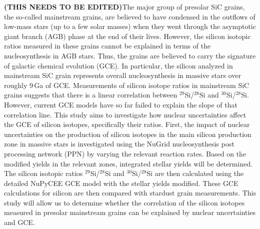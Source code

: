 \documentclass{brandeis-thesis3.2}
\newcommand{\iso}[2]{$^{#1}${#2}}
\begin{document}
\clearpage

\begin{thesis-abstract}
\textbf{(THIS NEEDS TO BE EDITED)}The major group of presolar SiC grains, the so-called mainstream grains, are believed to have condensed in the outflows of low-mass stars (up to a few solar masses) when they went through the asymptotic giant branch (AGB) phase at the end of their lives. However, the silicon isotopic ratios measured in these grains cannot be explained in terms of the nucleosynthesis in AGB stars. Thus, the grains are believed to carry the signature of galactic chemical evolution (GCE). In particular, the silicon analyzed in mainstream SiC grain represents overall nucleosynthesis in massive stars over roughly 9\,Ga of GCE. Measurements of silicon isotope ratios in mainstream SiC grains suggests that there is a linear correlation between \iso{29}{Si}/\iso{28}{Si} and \iso{30}{Si}/\iso{28}{Si}. However, current GCE models have so far failed to explain the slope of that correlation line. This study aims to investigate how nuclear uncertainties affect the GCE of silicon isotopes, specifically their ratios. First, the impact of nuclear uncertainties on the production of silicon isotopes in the main silicon production zone in massive stars is investigated using the NuGrid nucleosynthesis post processing network (PPN) by varying the relevant reaction rates. Based on the modified yields in the relevant zones, integrated stellar yields will be determined. The silicon isotopic ratios \iso{29}{Si}/\iso{28}{Si} and \iso{30}{Si}/\iso{28}{Si} are then calculated using the detailed NuPyCEE GCE model with the stellar yields modified. These GCE calculations for silicon are then compared with stardust grain measurements. This study will allow us to determine whether the correlation of the silicon isotopes measured in presolar mainstream grains can be explained by nuclear  uncertainties and GCE.

\end{thesis-abstract}

\clearpage

\tableofcontents
\clearpage


\end{document}
